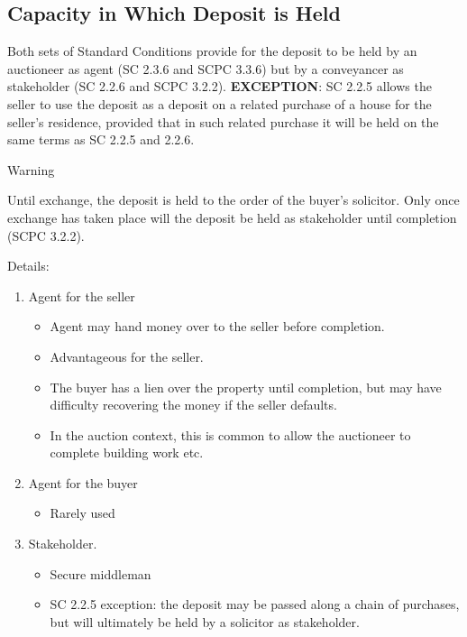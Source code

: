 \documentclass[
]{article}
\providecommand{\tightlist}{%
  \setlength{\itemsep}{0pt}\setlength{\parskip}{0pt}}
\newenvironment{env-6551cd31-4c34-4de5-9b70-48dd453ea5fd}
{
    \savenotes\tcolorbox[blanker,breakable,left=5pt,borderline west={2pt}{-4pt}{orange}]
}
{
    \endtcolorbox\spewnotes
}
\begin{document}
\hypertarget{capacity-in-which-deposit-is-held}{%
\subsection{Capacity in Which Deposit is
Held}\label{capacity-in-which-deposit-is-held}}

Both sets of Standard Conditions provide for the deposit to be held by
an auctioneer as agent (SC 2.3.6 and SCPC 3.3.6) but by a conveyancer as
stakeholder (SC 2.2.6 and SCPC 3.2.2). \textbf{EXCEPTION}: SC 2.2.5
allows the seller to use the deposit as a deposit on a related purchase
of a house for the seller's residence, provided that in such related
purchase it will be held on the same terms as SC 2.2.5 and 2.2.6.

\begin{env-6551cd31-4c34-4de5-9b70-48dd453ea5fd}

Warning

Until exchange, the deposit is held to the order of the buyer's
solicitor. Only once exchange has taken place will the deposit be held
as stakeholder until completion (SCPC 3.2.2).

\end{env-6551cd31-4c34-4de5-9b70-48dd453ea5fd}

Details:

\begin{enumerate}
\tightlist
\item
  Agent for the seller

  \begin{itemize}
  \tightlist
  \item
    Agent may hand money over to the seller before completion.
  \item
    Advantageous for the seller.
  \item
    The buyer has a lien over the property until completion, but may
    have difficulty recovering the money if the seller defaults.
  \item
    In the auction context, this is common to allow the auctioneer to
    complete building work etc.
  \end{itemize}
\item
  Agent for the buyer

  \begin{itemize}
  \tightlist
  \item
    Rarely used
  \end{itemize}
\item
  Stakeholder.

  \begin{itemize}
  \tightlist
  \item
    Secure middleman
  \item
    SC 2.2.5 exception: the deposit may be passed along a chain of
    purchases, but will ultimately be held by a solicitor as
    stakeholder.
  \end{itemize}
\end{enumerate}
\end{document}
